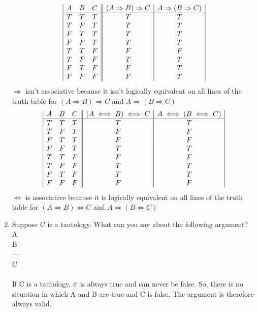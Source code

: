 \documentclass[]{article}
\begin{document}
\begin{enumerate}
\begin{displaymath}
    \begin{array}{|c c c||c|c|}
    A & B & C & (A \Rightarrow B)\Rightarrow C & A \Rightarrow (B \Rightarrow C)\\
    \hline
    T & T & T & T & T\\
    T & F & T & T & T\\
    F & T & T & T & T\\
    F & F & T & T & T\\
    T & T & F & F & F\\
    T & F & F & T & T\\
    F & T & F & F & T\\
    F & F & F & F & T\\
    \end{array}
    \end{displaymath}
    \newline $\Rightarrow$ isn't associative because it isn't logically equivalent on all lines of the truth table for $(A \Rightarrow B)\Rightarrow C$ and $A \Rightarrow (B \Rightarrow C)$
    \newline
    \begin{displaymath}
    \begin{array}{|c c c||c|c|}
    A & B & C & (A \iff B)\iff C & A \iff (B \iff C)\\
    \hline
    T & T & T & T & T\\
    T & F & T & F & F\\
    F & T & T & F & F\\
    F & F & T & T & T\\
    T & T & F & F & F\\
    T & F & F & T & T\\
    F & T & F & T & T\\
    F & F & F & F & F\\
    \end{array}
    \end{displaymath}
    \newline $\iff$ is associative because it is logically equivalent on all lines of the truth table for $(A \iff B)\iff C$ and $A \iff (B \iff C)$
    
    \item  Suppose C is a tautology. What can you say about the following argument? \\ A \\ B \\ --- \\C
    \\\\ If C is a tautology, it is always true and can never be false. So, there is no situation in which A and B are true and C is false. The argument is therefore always valid.
    

\end{enumerate}
\end{document}
